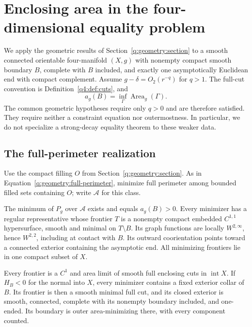 \section{Enclosing area in the four-dimensional equality problem}
\label{q4:sec:enclosures}
\label{q4:enc:section}

We apply the geometric results of Section~\ref{q:geometry:section}
to a smooth connected orientable four-manifold $(X,g)$ with nonempty
compact smooth boundary $B$, complete with $B$ included, and exactly
one asymptotically Euclidean end with compact complement. Assume
$g-\delta=O_2(r^{-q})$ for $q>1$. The full-cut convention is
Definition~\ref{q4:def:cuts}, and
\[
 a_g(B)=\inf_{\Gamma}\operatorname{Area}_g(\Gamma).
\]
The common geometric hypotheses require only $q>0$ and are therefore
satisfied. They require neither a constraint equation nor
outermostness. In particular, we do not specialize a strong-decay
equality theorem to these weaker data.

\subsection{The full-perimeter realization}
\label{q4:enc:obstacle-setup}

Use the compact filling $O$ from Section~\ref{q:geometry:section}.
As in Equation~\eqref{q:geometry:full-perimeter}, minimize full
perimeter among bounded filled sets containing $O$; write
$\mathcal A$ for this class.

\begin{proposition}
\label{q4:enc:minimizing-hull}
The minimum of $P_g$ over $\mathcal A$ exists and equals $a_g(B)>0$.
Every minimizer has a regular representative whose frontier $T$ is a
nonempty compact embedded $C^{1,1}$ hypersurface, smooth and minimal
on $T\setminus B$. Its graph functions are locally $W^{2,\infty}$,
hence $W^{2,2}$, including at contact with $B$. Its outward
coorientation points toward a connected exterior containing the
asymptotic end. All minimizing frontiers lie in one compact subset
of $X$.

Every frontier is a $C^1$ and area limit of smooth full enclosing
cuts in $\operatorname{int}X$. If $H_B<0$ for the normal into $X$,
every minimizer contains a fixed exterior collar of $B$. Its frontier
is then a smooth minimal full cut, and its closed exterior is smooth,
connected, complete with its nonempty boundary included, and
one-ended. Its boundary is outer area-minimizing there, with every
component counted.
\end{proposition}

